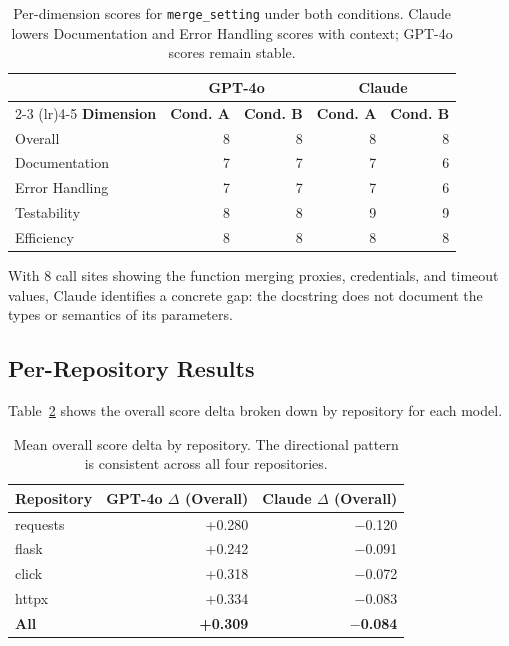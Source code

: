 \documentclass[12pt]{report}
\begin{document}
\begin{table}[htbp]
\centering
\begin{tabular}{lrrrr}
\toprule
& \multicolumn{2}{c}{\textbf{GPT-4o}} & \multicolumn{2}{c}{\textbf{Claude}} \\
\cmidrule(lr){2-3} \cmidrule(lr){4-5}
\textbf{Dimension} & \textbf{Cond. A} & \textbf{Cond. B} & \textbf{Cond. A} & \textbf{Cond. B} \\
\midrule
Overall        & 8 & 8 & 8 & 8 \\
Documentation  & 7 & 7 & 7 & 6 \\
Error Handling & 7 & 7 & 7 & 6 \\
Testability    & 8 & 8 & 9 & 9 \\
Efficiency     & 8 & 8 & 8 & 8 \\
\bottomrule
\end{tabular}
\caption{Per-dimension scores for \texttt{merge\_setting} under both conditions. Claude lowers Documentation and Error Handling scores with context; GPT-4o scores remain stable.}
\label{tab:merge_setting}
\end{table}

With 8 call sites showing the function merging proxies, credentials, and timeout values, Claude identifies a concrete gap: the docstring does not document the types or semantics of its parameters.

\subsection{Per-Repository Results}

Table~\ref{tab:per_repo} shows the overall score delta broken down by repository for each model.

\begin{table}[htbp]
\centering
\begin{tabular}{lrr}
\toprule
\textbf{Repository} & \textbf{GPT-4o $\Delta$ (Overall)} & \textbf{Claude $\Delta$ (Overall)} \\
\midrule
requests & +0.280 & $-$0.120 \\
flask    & +0.242 & $-$0.091 \\
click    & +0.318 & $-$0.072 \\
httpx    & +0.334 & $-$0.083 \\
\midrule
\textbf{All} & \textbf{+0.309} & \textbf{$-$0.084} \\
\bottomrule
\end{tabular}
\caption{Mean overall score delta by repository. The directional pattern is consistent across all four repositories.}
\label{tab:per_repo}
\end{table}
\end{document}
